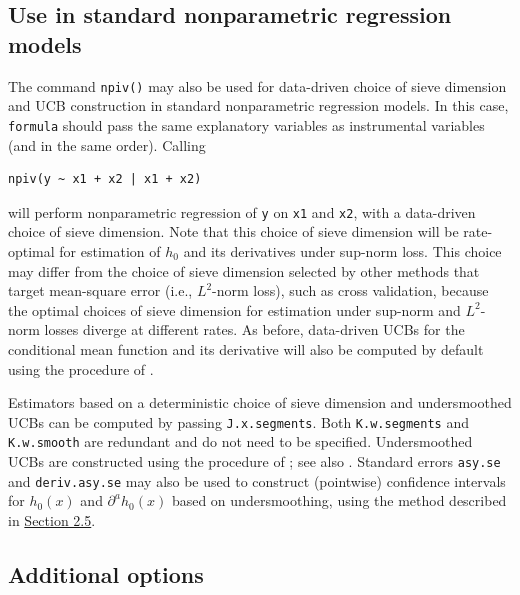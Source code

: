 \documentclass[
]{jss}
\begin{document}
\hypertarget{use-in-standard-nonparametric-regression-models}{%
\subsection{Use in standard nonparametric regression
models}\label{use-in-standard-nonparametric-regression-models}}

The command \texttt{npiv()} may also be used for data-driven choice of
sieve dimension and UCB construction in standard nonparametric
regression models. In this case, \texttt{formula} should pass the same
explanatory variables as instrumental variables (and in the same order).
Calling

\begin{verbatim}
npiv(y ~ x1 + x2 | x1 + x2)
\end{verbatim}

will perform nonparametric regression of \texttt{y} on \texttt{x1} and
\texttt{x2}, with a data-driven choice of sieve dimension. Note that
this choice of sieve dimension will be rate-optimal for estimation of
\(h_0\) and its derivatives under sup-norm loss. This choice may differ
from the choice of sieve dimension selected by other methods that target
mean-square error (i.e., \(L^2\)-norm loss), such as cross validation,
because the optimal choices of sieve dimension for estimation under
sup-norm and \(L^2\)-norm losses diverge at different rates. As before,
data-driven UCBs for the conditional mean function and its derivative
will also be computed by default using the procedure of \citet{CCK}.

Estimators based on a deterministic choice of sieve dimension and
undersmoothed UCBs can be computed by passing \texttt{J.x.segments}.
Both \texttt{K.w.segments} and \texttt{K.w.smooth} are redundant and do
not need to be specified. Undersmoothed UCBs are constructed using the
procedure of \citet{CCQE}; see also \citet{BCCK}. Standard errors
\texttt{asy.se} and \texttt{deriv.asy.se} may also be used to construct
(pointwise) confidence intervals for \(h_0(x)\) and
\(\partial^a h_0(x)\) based on undersmoothing, using the method
described in \protect\hyperlink{pw}{Section 2.5}.

\newpage

\hypertarget{additional-options}{%
\subsection{Additional options}\label{additional-options}}
\end{document}
